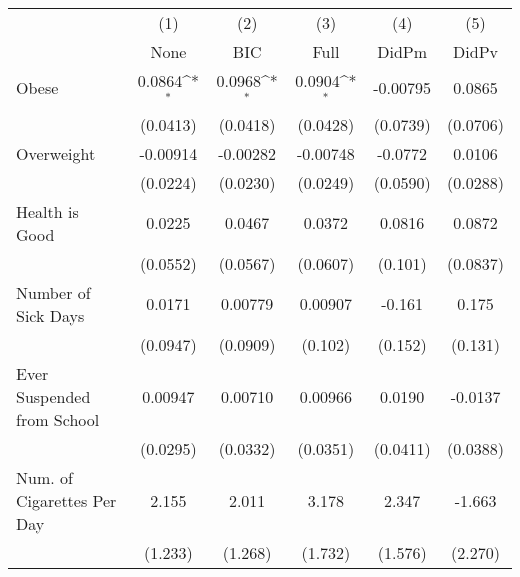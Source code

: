 {
\def\sym#1{\ifmmode^{#1}\else\(^{#1}\)\fi}
\begin{tabular}{l*{5}{c}}
\toprule
            &\multicolumn{1}{c}{(1)}&\multicolumn{1}{c}{(2)}&\multicolumn{1}{c}{(3)}&\multicolumn{1}{c}{(4)}&\multicolumn{1}{c}{(5)}\\
            &\multicolumn{1}{c}{None}&\multicolumn{1}{c}{BIC}&\multicolumn{1}{c}{Full}&\multicolumn{1}{c}{DidPm}&\multicolumn{1}{c}{DidPv}\\
\midrule
Obese       &      0.0864\sym{*}  &      0.0968\sym{*}  &      0.0904\sym{*}  &    -0.00795         &      0.0865         \\
            &    (0.0413)         &    (0.0418)         &    (0.0428)         &    (0.0739)         &    (0.0706)         \\
\addlinespace
Overweight  &    -0.00914         &    -0.00282         &    -0.00748         &     -0.0772         &      0.0106         \\
            &    (0.0224)         &    (0.0230)         &    (0.0249)         &    (0.0590)         &    (0.0288)         \\
\addlinespace
Health is Good&      0.0225         &      0.0467         &      0.0372         &      0.0816         &      0.0872         \\
            &    (0.0552)         &    (0.0567)         &    (0.0607)         &     (0.101)         &    (0.0837)         \\
\addlinespace
Number of Sick Days&      0.0171         &     0.00779         &     0.00907         &      -0.161         &       0.175         \\
            &    (0.0947)         &    (0.0909)         &     (0.102)         &     (0.152)         &     (0.131)         \\
\addlinespace
Ever Suspended from School&     0.00947         &     0.00710         &     0.00966         &      0.0190         &     -0.0137         \\
            &    (0.0295)         &    (0.0332)         &    (0.0351)         &    (0.0411)         &    (0.0388)         \\
\addlinespace
Num. of Cigarettes Per Day&       2.155         &       2.011         &       3.178         &       2.347         &      -1.663         \\
            &     (1.233)         &     (1.268)         &     (1.732)         &     (1.576)         &     (2.270)         \\
\bottomrule
\end{tabular}
}
